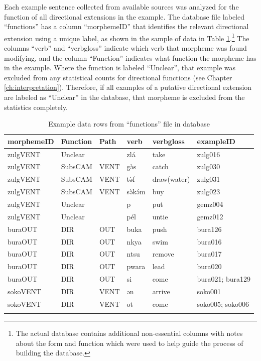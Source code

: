 Each example sentence collected from available sources was analyzed for the function of all directional extensions in the example. The database file labeled ``functions'' has a column ``morphemeID'' that identifies the relevant directional extension using a unique label, as shown in the sample of data in Table \ref{tab:database}.\footnote{The actual database contains additional non-essential columns with notes about the form and function which were used to help guide the process of building the database.} The columns ``verb'' and ``verbgloss'' indicate which verb that morpheme was found modifying, and the column ``Function'' indicates what function the morpheme has in the example. Where the function is labeled ``Unclear'', that example was excluded from any statistical counts for directional functions (see Chapter \ref{ch:interpretation}). Therefore, if all examples of a putative directional extension are labeled as ``Unclear'' in the database, that morpheme is excluded from the statistics completely.
	
	\begin{table}
		\caption{Example data rows from ``functions'' file in database}
		\label{tab:database}
		\begin{tabular}{llllll} %
			\lsptoprule
			morphemeID  & Function & Path & verb & verbgloss & exampleID \\
			\midrule
			zulgVENT &  Unclear &  & zlá & take & zulg016 \\
			zulgVENT &  SubsCAM & VENT & gə̀s & catch & zulg030 \\
			zulgVENT &  SubsCAM & VENT & tə̀f & draw(water) & zulg031 \\
			zulgVENT &  SubsCAM & VENT & sə̀kə́m & buy & zulg023 \\
			zulgVENT &  Unclear &  & p & put & gemz004 \\
			zulgVENT &  Unclear &  & pél & untie & gemz012 \\
			buraOUT &  DIR & OUT & buka & push & bura126 \\
			buraOUT	& DIR & 	OUT	& nkya	& swim	& bura016 \\
			buraOUT	& DIR	& OUT	& ntsu	& remove	& bura017\\
			buraOUT	& DIR	& OUT	& pwara	& lead	& bura020\\
			buraOUT	& DIR	& OUT	& si	& come	& bura021; bura129\\
			sokoVENT	& DIR	& VENT	& ən	& arrive	& soko001\\
			sokoVENT	& DIR	& VENT	& ot	& come	& soko005; soko006 \\
			\lspbottomrule
		\end{tabular}
	\end{table}

